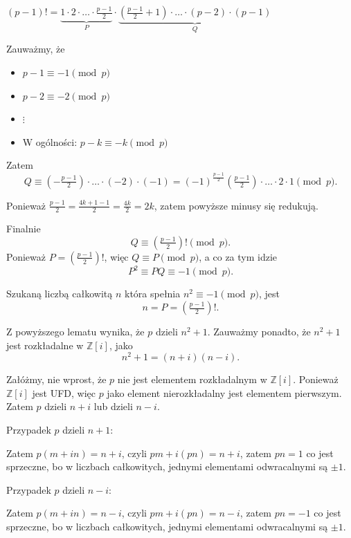 \begin{solution}
\begin{lemma}
		$\left( p-1 \right)! = \underbrace{1\cdot 2 \cdot \ldots \cdot \frac{p-1}{2}}_{P}\cdot \underbrace{\left( \frac{p-1}{2}+1 \right) \cdot \ldots \cdot \left( p-2 \right)\cdot \left( p-1 \right) }_{Q}$
	
		Zauważmy, że 
		\begin{itemize}
			\item $p-1 \equiv -1 \pmod{p} $ 
			\item $p-2 \equiv -2 \pmod{p}$ 
			\item $\vdots$
			\item W ogólności: $p-k \equiv -k \pmod{p} $
		\end{itemize}
		
		Zatem
		\[
		 Q \equiv \left( - \tfrac{p-1}{2} \right)\cdot \ldots \cdot \left( -2 \right) \cdot \left( -1 \right) = \left( -1 \right)^{\frac{p-1}{2}}\left( \tfrac{p-1}{2} \right) \cdot \ldots \cdot 2 \cdot 1 \pmod{p} 
		.\] 

		Ponieważ $\tfrac{p-1}{2} = \tfrac{4k +1 -1}{2} = \tfrac{4k}{2} = 2k$, zatem powyższe minusy się redukują. 

		Finalnie 
		 \[
		Q \equiv \left( \tfrac{p-1}{2} \right)! \pmod{p} 		
		.\] 
		Ponieważ $P = \left( \tfrac{p-1}{2} \right)!$, więc $Q \equiv P \pmod{p} $, a co za tym idzie
		\[
		P^2 \equiv PQ \equiv -1 \pmod{p} 
		.\] 

		Szukaną liczbą całkowitą $n$ która spełnia $n^2 \equiv -1 \pmod{p} $, jest
		\[
		n = P = \left(\tfrac{p-1}{2} \right)!
		.\] 
	\end{lemma}
	 Z powyższego lematu wynika, że $p$ dzieli $n^2 + 1$. Zauważmy ponadto, że $n^2 + 1$  jest rozkładalne w $\mathbb{Z}\left[ i \right] $, jako
	 \[
	 n^2 + 1 = \left(n + i\right)\left( n-i \right) 
	 .\] 

	 Załóżmy, nie wprost, że $p$ nie jest elementem rozkładalnym w $\mathbb{Z}\left[ i \right] $. Ponieważ $\mathbb{Z}\left[ i \right] $ jest UFD, więc $p$ jako element nierozkładalny jest elementem pierwszym. Zatem $p$ dzieli  $n + i$ lub dzieli $n - i$.

	\noindent Przypadek $p$ dzieli $n+1$:

	Zatem $p\left( m+ in \right) = n + i$, czyli $pm + i\left( pn \right) = n + i$, zatem $pn = 1$ co jest sprzeczne, bo w liczbach całkowitych, jednymi elementami odwracalnymi są $\pm 1$.

	\noindent Przypadek $p$ dzieli $n-i$:

	Zatem $p\left( m+ in \right) = n - i$, czyli $pm + i\left( pn \right) = n - i$, zatem $pn = -1$ co jest sprzeczne, bo w liczbach całkowitych, jednymi elementami odwracalnymi są $\pm 1$.
\end{solution} 
